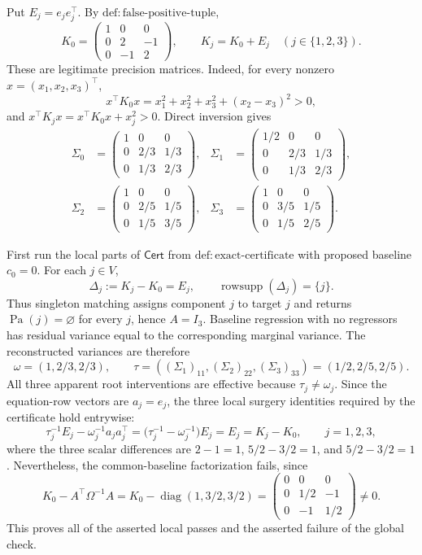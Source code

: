 Put \(E_j=e_je_j^{\top}\).  By \(\mathrm{def:false\mbox{-}positive\mbox{-}tuple}\),
\[
 K_0=\begin{pmatrix}1&0&0\\0&2&-1\\0&-1&2\end{pmatrix},
 \qquad K_j=K_0+E_j\quad(j\in\{1,2,3\}).
\]
These are legitimate precision matrices.  Indeed, for every nonzero
\(x=(x_1,x_2,x_3)^{\top}\),
\[
 x^{\top}K_0x=x_1^2+x_2^2+x_3^2+(x_2-x_3)^2>0,
\]
and \(x^{\top}K_jx=x^{\top}K_0x+x_j^2>0\).  Direct inversion gives
\[
 \begin{aligned}
 \Sigma_0&=\begin{pmatrix}1&0&0\\0&2/3&1/3\\0&1/3&2/3\end{pmatrix},&
 \Sigma_1&=\begin{pmatrix}1/2&0&0\\0&2/3&1/3\\0&1/3&2/3\end{pmatrix},\\
 \Sigma_2&=\begin{pmatrix}1&0&0\\0&2/5&1/5\\0&1/5&3/5\end{pmatrix},&
 \Sigma_3&=\begin{pmatrix}1&0&0\\0&3/5&1/5\\0&1/5&2/5\end{pmatrix}.
 \end{aligned}
\]

First run the local parts of \(\mathsf{Cert}\) from
\(\mathrm{def:exact\mbox{-}certificate}\) with proposed baseline \(c_0=0\).  For
each \(j\in V\),
\[
 \Delta_j:=K_j-K_0=E_j,
 \qquad \operatorname{rowsupp}(\Delta_j)=\{j\}.
\]
Thus singleton matching assigns component \(j\) to target \(j\) and returns
\(\operatorname{Pa}(j)=\varnothing\) for every \(j\), hence \(A=I_3\).
Baseline regression with no regressors has residual variance equal to the
corresponding marginal variance.  The reconstructed variances are therefore
\[
 \omega=(1,2/3,2/3),
 \qquad
 \tau=((\Sigma_1)_{11},(\Sigma_2)_{22},(\Sigma_3)_{33})=(1/2,2/5,2/5).
\]
All three apparent root interventions are effective because
\(\tau_j\neq\omega_j\).  Since the equation-row vectors are
\(a_j=e_j\), the three local surgery identities required by the certificate
hold entrywise:
\[
 \tau_j^{-1}E_j-\omega_j^{-1}a_ja_j^{\top}
 =\bigl(\tau_j^{-1}-\omega_j^{-1}\bigr)E_j
 =E_j
 =K_j-K_0,
 \qquad j=1,2,3,
\]
where the three scalar differences are
\(2-1=1\), \(5/2-3/2=1\), and \(5/2-3/2=1\).
Nevertheless, the common-baseline factorization fails, since
\[
 K_0-A^{\top}\Omega^{-1}A
 =K_0-\operatorname{diag}(1,3/2,3/2)
 =\begin{pmatrix}0&0&0\\0&1/2&-1\\0&-1&1/2\end{pmatrix}\neq0.
\]
This proves all of the asserted local passes and the asserted failure of the
global check.

